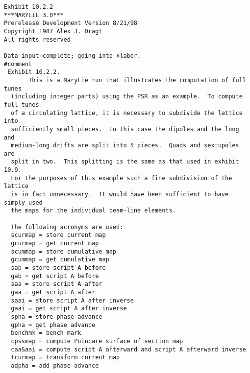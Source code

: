 \begin{footnotesize}
\begin{verbatim}
Exhibit 10.2.2
***MARYLIE 3.0***
Prerelease Development Version 8/21/98
Copyright 1987 Alex J. Dragt
All rights reserved

Data input complete; going into #labor.
#comment
 Exhibit 10.2.2.
       This is a MaryLie run that illustrates the computation of full tunes
  (including integer parts) using the PSR as an example.  To compute full tunes
  of a circulating lattice, it is necessary to subdivide the lattice into
  sufficiently small pieces.  In this case the dipoles and the long and
  medium-long drifts are split into 5 pieces.  Quads and sextupoles are
  split in two.  This splitting is the same as that used in exhibit 10.9.
  For the purposes of this example such a fine subdivision of the lattice
  is in fact unnecessary.  It would have been sufficient to have simply used
  the maps for the individual beam-line elements.

  The following acronyms are used:
  scurmap = store current map
  gcurmap = get current map
  scummap = store cumulative map
  gcummap = get cumulative map
  sab = store script A before
  gab = get script A before
  saa = store script A after
  gaa = get script A after
  saai = store script A after inverse
  gaai = get script A after inverse
  spha = store phase advance
  gpha = get phase advance
  benchmk = bench mark
  cpssmap = compute Poincare surface of section map
  caa&aai = compute script A afterward and script A afterward inverse
  tcurmap = transform current map
  adpha = add phase advance


\end{verbatim}
\end{footnotesize}
